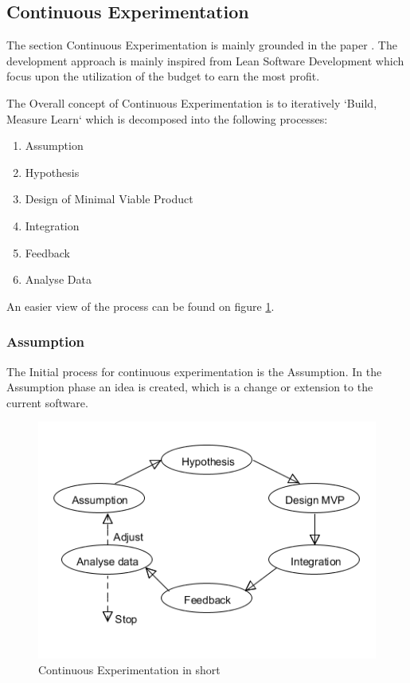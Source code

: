 \documentclass{sig-alternate}
\begin{document}
\subsection{Continuous Experimentation}
The section Continuous Experimentation is mainly grounded in the paper \cite{bowman:reasoning}.
The development approach is mainly inspired from Lean Software Development which focus upon 
the utilization of the budget to earn the most profit.

The Overall concept of Continuous Experimentation is to iteratively `Build, Measure Learn` which is
decomposed into the following processes: 
\begin{enumerate}
\item Assumption
\item Hypothesis
\item Design of Minimal Viable Product
\item Integration
\item Feedback
\item Analyse Data
\end{enumerate}

An easier view of the process can be found on figure \ref{fig:continuousdev}.

\subsubsection{Assumption}
\label{cx:assumption}
The Initial process for continuous experimentation is the Assumption.
In the Assumption phase an idea is created, which is a change or extension to the current software.

\begin{figure}
\centering
\includegraphics[scale=0.5]{Umlet/conexp}
\caption{Continuous Experimentation in short}
\label{fig:continuousdev}
\end{figure}
\end{document}
